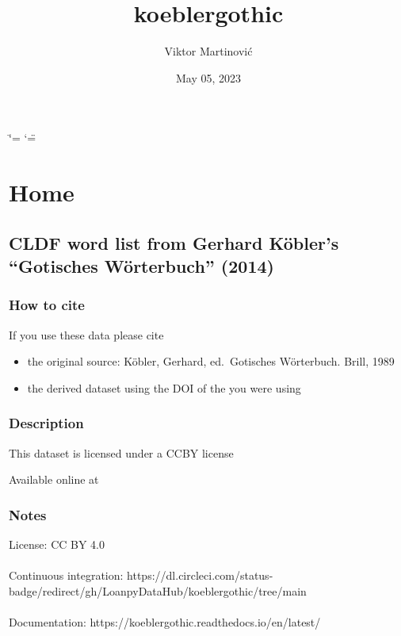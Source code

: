 \documentclass[letterpaper,10pt,english]{sphinxmanual}
\title{koeblergothic}
\date{May 05, 2023}
\author{Viktor Martinović}
\begin{document}
\ifdefined\shorthandoff
  \ifnum\catcode`\=\string=\active\shorthandoff{=}\fi
  \ifnum\catcode`\"=\active{}\fi
\fi

\pagestyle{empty}
\sphinxmaketitle
\pagestyle{plain}
\sphinxtableofcontents
\pagestyle{normal}
\label{\detokenize{index::doc}}


\sphinxstepscope


\chapter{Home}
\label{\detokenize{home:home}}\label{\detokenize{home::doc}}

\section{CLDF word list from Gerhard Köbler’s “Gotisches Wörterbuch” (2014)}
\label{\detokenize{home:cldf-word-list-from-gerhard-koblers-gotisches-worterbuch-2014}}

\subsection{How to cite}
\label{\detokenize{home:how-to-cite}}
\sphinxAtStartPar
If you use these data please cite
\begin{itemize}
\item {} 
\sphinxAtStartPar
the original source: Köbler, Gerhard, ed. Gotisches Wörterbuch. Brill, 1989

\item {} 
\sphinxAtStartPar
the derived dataset using the DOI of the  you were using

\end{itemize}


\subsection{Description}
\label{\detokenize{home:description}}
\sphinxAtStartPar
This dataset is licensed under a CC\sphinxhyphen{}BY license

\sphinxAtStartPar
Available online at 


\subsection{Notes}
\label{\detokenize{home:notes}}
\sphinxAtStartPar
License: CC BY 4.0\\\\
 Continuous integration: https://dl.circleci.com/status-badge/redirect/gh/LoanpyDataHub/koeblergothic/tree/main\\\\
 Documentation: https://koeblergothic.readthedocs.io/en/latest/\\\\
\end{document}
